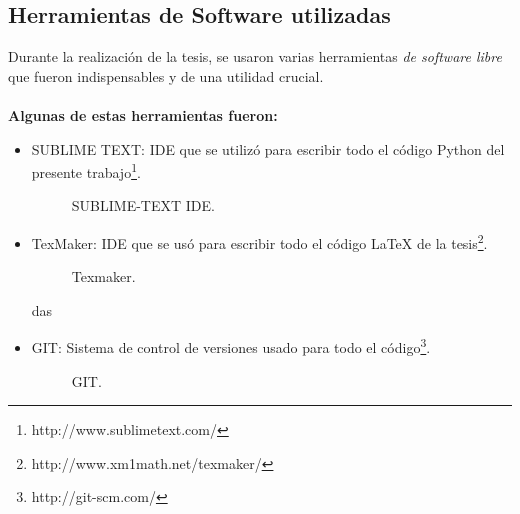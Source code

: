 	\subsection{Herramientas de Software utilizadas}
	    Durante la realización de la tesis, se usaron varias herramientas \textit{de software libre} que fueron indispensables y de una utilidad crucial. \\
	    \\
	   \textbf{ Algunas de estas herramientas fueron:}
	   \begin{itemize}

	       \item SUBLIME TEXT: IDE que se utilizó para escribir todo el código Python del presente trabajo\footnote{http://www.sublimetext.com/}.
					\begin{figure}[htbp]
						\centering
						\caption{SUBLIME-TEXT IDE.}
						\label{fig:sublime_ide}
					\end{figure}

	       \item TexMaker: IDE que se usó para escribir todo el código \LaTeX{} de la tesis\footnote{http://www.xm1math.net/texmaker/}.
					\begin{figure}[htbp]
						\centering
						\caption{Texmaker.}
						\label{fig:texmaker}
					\end{figure}
das
	       \item GIT: Sistema de control de versiones usado para todo el código\footnote{http://git-scm.com/}.
					\begin{figure}[htbp]
						\centering
						\caption{GIT.}
						\label{fig:git}
					\end{figure}
	   \end{itemize}
	
